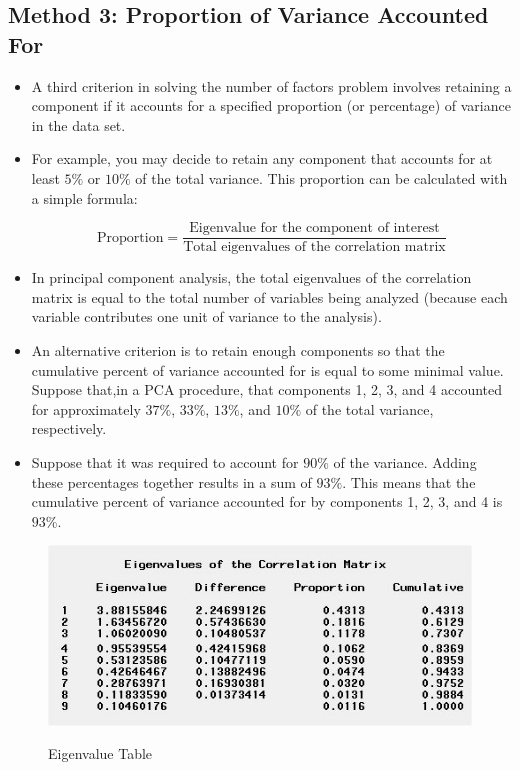 \documentclass[a4paper,12pt]{article}
\begin{document}
\subsection{Method 3: Proportion of Variance Accounted For}

\begin{itemize}
	\item A third criterion in solving the number of factors
	problem involves retaining a component if it accounts for a specified proportion (or percentage)
	of variance in the data set. 
	\item For example, you may decide to retain any component that accounts
	for at least $5\%$ or $10\%$ of the total variance.  This proportion can be calculated with a simple
	formula:
	
	\[ \mbox{Proportion}  = \frac{\mbox{Eigenvalue for the component of interest}}{\mbox{Total eigenvalues of the correlation matrix}}  \]
	
	\item 	In principal component analysis, the total eigenvalues of the correlation matrix is equal to the
	total number of variables being analyzed (because each variable contributes one unit of variance
	to the analysis).
	
	\item 	An alternative criterion is to retain enough components so that the cumulative percent of variance
	accounted for is equal to some minimal value.  Suppose that,in a PCA procedure, that components 1, 2, 3,
	and 4 accounted for approximately $37\%$, $33\%$, $13\%$, and $10\%$ of the total variance, respectively.
	
	\item 	Suppose that it was required to account for $90\%$ of the variance. Adding these percentages together results in a sum of $93\%$.  This means that the cumulative percent of variance accounted for by components 1, 2, 3, and 4 is $93\%$.
\end{itemize}


\begin{figure}[h!]
	\begin{center}
		\includegraphics[scale=0.9]{3AEigen.jpg}\\
		\caption{Eigenvalue Table}\label{Eigenvalue Table}
	\end{center}
	
\end{figure}
\end{document}
